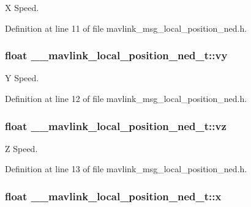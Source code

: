 X Speed. 



Definition at line 11 of file mavlink\-\_\-msg\-\_\-local\-\_\-position\-\_\-ned.\-h.

\hypertarget{struct____mavlink__local__position__ned__t_a0e9a5142819014e5807a657409608fa6}{
\subsubsection[{vy}]{\setlength{\rightskip}{0pt plus 5cm}float \-\_\-\-\_\-mavlink\-\_\-local\-\_\-position\-\_\-ned\-\_\-t\-::vy}}\label{struct____mavlink__local__position__ned__t_a0e9a5142819014e5807a657409608fa6}


Y Speed. 



Definition at line 12 of file mavlink\-\_\-msg\-\_\-local\-\_\-position\-\_\-ned.\-h.

\hypertarget{struct____mavlink__local__position__ned__t_aa34bbb949b0afd4bd524f455b9d980f6}{
\subsubsection[{vz}]{\setlength{\rightskip}{0pt plus 5cm}float \-\_\-\-\_\-mavlink\-\_\-local\-\_\-position\-\_\-ned\-\_\-t\-::vz}}\label{struct____mavlink__local__position__ned__t_aa34bbb949b0afd4bd524f455b9d980f6}


Z Speed. 



Definition at line 13 of file mavlink\-\_\-msg\-\_\-local\-\_\-position\-\_\-ned.\-h.

\hypertarget{struct____mavlink__local__position__ned__t_ab8f239110cba8ccc0f92aab56bc9a1d3}{
\subsubsection[{x}]{\setlength{\rightskip}{0pt plus 5cm}float \-\_\-\-\_\-mavlink\-\_\-local\-\_\-position\-\_\-ned\-\_\-t\-::x}}\label{struct____mavlink__local__position__ned__t_ab8f239110cba8ccc0f92aab56bc9a1d3}


